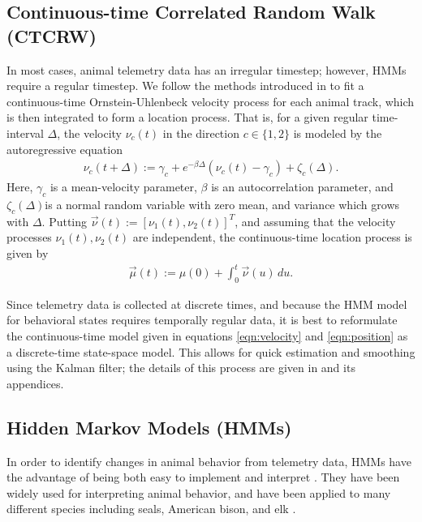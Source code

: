 \documentclass[12pt]{article}
\begin{document}
	
	\subsection{Continuous-time Correlated Random Walk (CTCRW)} \label{sec:ctcrw}
	
	In most cases, animal telemetry data has an irregular timestep; however, HMMs require a regular timestep. We follow the methods introduced in \cite{Johnson2008} to fit a continuous-time Ornstein-Uhlenbeck velocity process for each animal track, which is then integrated to form a location process. That is, for a given regular time-interval $\Delta$, the velocity $\nu_c(t)$ in the direction $c \in \{1, 2\}$ is modeled by the autoregressive equation
	\begin{align}
		\nu_c(t + \Delta) := \gamma_c + e^{-\beta \Delta} (\nu_c(t) - \gamma_c) + \zeta_c(\Delta). \label{eqn:velocity}
	\end{align}
	Here, $\gamma_c$ is a mean-velocity parameter, $\beta$ is an autocorrelation parameter, and $\zeta_c(\Delta)$is a normal random variable with zero mean, and variance which grows with $\Delta$. Putting $\vec \nu(t) := [\nu_1(t), \nu_2(t)]^T$, and assuming that the velocity processes $\nu_1(t), \nu_2(t)$ are independent, the continuous-time location process is given by
	\begin{align}
		\vec \mu(t) := \mu(0) + \int_0^t \vec \nu(u) \, du. \label{eqn:position}
	\end{align}
	
	Since telemetry data is collected at discrete times, and because the HMM model for behavioral states requires temporally regular data, it is best to reformulate the continuous-time model given in equations \eqref{eqn:velocity} and \eqref{eqn:position} as a discrete-time state-space model. This allows for quick estimation and smoothing using the Kalman filter; the details of this process are given in \cite{Johnson2008} and its appendices.
	
	\subsection{Hidden Markov Models (HMMs)} \label{sec:hmm}
	
	In order to identify changes in animal behavior from telemetry data, HMMs have the advantage of being both easy to implement and interpret \cite{McClintock2018}. They have been widely used for interpreting animal behavior, and have been applied to many different species including seals, American bison, and elk \cite{Jonsen2005, McClintock2012, Morales2004}.
	
\end{document}
